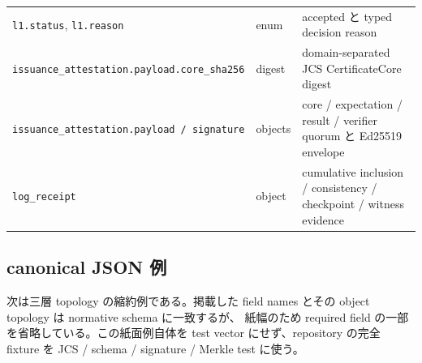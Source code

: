 \documentclass[a4paper,11pt]{ltjsarticle}
\newcommand{\code}[1]{\texttt{#1}}
\begin{document}
\begin{longtable}{@{}L{44mm}L{27mm}L{72mm}@{}}
\code{l1.status}, \code{l1.reason} & enum & accepted と typed decision reason \\
\code{issuance\_attestation.}\newline\code{payload.core\_sha256} & digest & domain-separated JCS CertificateCore digest \\
\code{issuance\_attestation.}\newline\code{payload / signature} & objects & core / expectation / result / verifier quorum と Ed25519 envelope \\
\code{log\_receipt} & object & cumulative inclusion / consistency / checkpoint / witness evidence \\
\bottomrule
\end{longtable}

\subsection{canonical JSON 例}

次は三層 topology の縮約例である。掲載した field names とその object topology は normative schema に一致するが、
紙幅のため required field の一部を省略している。この紙面例自体を test vector にせず、repository の完全 fixture を
JCS / schema / signature / Merkle test に使う。
\end{document}
